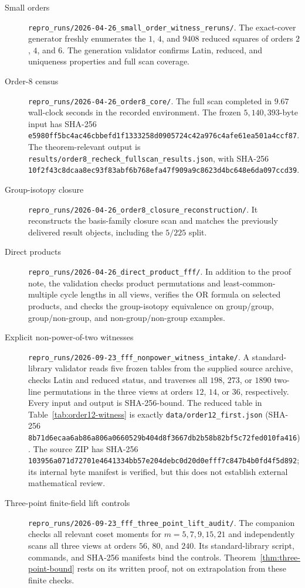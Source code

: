 \begin{description}
\item[Small orders]
\nolinkurl{repro_runs/2026-04-26_small_order_witness_reruns/}.
The exact-cover generator freshly enumerates the $1$, $4$, and $9408$ reduced
squares of orders $2$, $4$, and $6$.  The generation validator confirms
Latin, reduced, and uniqueness properties and full scan coverage.

\item[Order-$8$ census]
\nolinkurl{repro_runs/2026-04-26_order8_core/}.
The full scan completed in $9.67$ wall-clock seconds in the recorded
environment.  The frozen $5{,}140{,}393$-byte input has SHA-256
\nolinkurl{e5980ff5bc4ac46cbbefd1f1333258d0905724c42a976c4afe61ea501a4ccf87}.
The theorem-relevant output is
\nolinkurl{results/order8_recheck_fullscan_results.json}, with SHA-256
\nolinkurl{10f2f43c8dcaa8ec93f83abf6b768efa47f909a9c8623d4bc648e6da097ccd39}.

\item[Group-isotopy closure]
\nolinkurl{repro_runs/2026-04-26_order8_closure_reconstruction/}.
It reconstructs the basis-family closure scan and matches the previously
delivered result objects, including the $5/225$ split.

\item[Direct products]
\nolinkurl{repro_runs/2026-04-26_direct_product_fff/}.
In addition to the proof note, the validation checks product permutations and
least-common-multiple cycle lengths in all views, verifies the OR formula on
selected products, and checks the group-isotopy equivalence on group/group,
group/non-group, and non-group/non-group examples.

\item[Explicit non-power-of-two witnesses]
\nolinkurl{repro_runs/2026-09-23_fff_nonpower_witness_intake/}.
A standard-library validator reads five frozen tables from the supplied
source archive, checks Latin and reduced status, and traverses all $198$,
$273$, or $1890$ two-line permutations in the three views at orders $12$,
$14$, or $36$, respectively. Every input and output is SHA-256-bound. The
reduced table in Table~\ref{tab:order12-witness} is exactly
\nolinkurl{data/order12_first.json} (SHA-256
\nolinkurl{8b71d6ecaa6ab86a806a0660529b404d8f3667db2b58b82bf5c72fed010fa416}).
The source ZIP has SHA-256
\nolinkurl{103956a071d72701e4641334bb57e204debc0d20d0efff7c847b4b0fd4f5d892};
its internal byte manifest is verified, but this does not establish
external mathematical review.

\item[Three-point finite-field lift controls]
\nolinkurl{repro_runs/2026-09-23_fff_three_point_lift_audit/}.
The companion checks all relevant coset moments for $m=5,7,9,15,21$ and
independently scans all three views at orders $56$, $80$, and $240$. Its
standard-library script, commands, and SHA-256 manifests bind the controls.
Theorem~\ref{thm:three-point-bound} rests on its written proof, not on
extrapolation from these finite checks.


\end{description}
